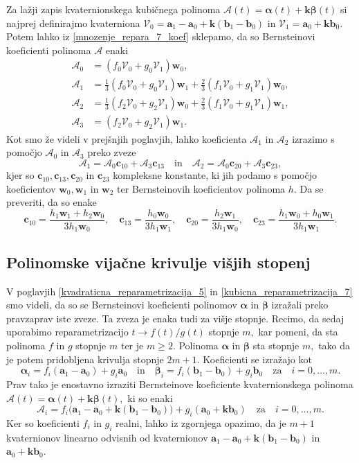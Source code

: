 \documentclass[12pt,a4paper,twoside]{article}
\theoremstyle{definition} %
\theoremstyle{plain} %
\theoremstyle{primerstyle}
\numberwithin{equation}{section}  %
\newcommand{\aV}{\mathbf{a}}
\newcommand{\bV}{\mathbf{b}}
\newcommand{\cV}{\mathbf{c}}
\newcommand{\kV}{\mathbf{k}}
\newcommand{\wV}{\mathbf{w}}
\newcommand{\AQ}{\mathcal{A}}
\newcommand{\VQ}{\mathcal{V}}
\newcommand{\balpha}{\boldsymbol \alpha}
\newcommand{\bbeta}{\boldsymbol \beta}
\begin{document}
Za lažji zapis kvaternionskega kubičnega polinoma $\AQ(t)=\balpha(t)+\kV\bbeta(t)$ si najprej definirajmo kvaterniona $\VQ_0=\aV_1-\aV_0+\kV(\bV_1-\bV_0)$ in $\VQ_1=\aV_0+\kV\bV_0.$ Potem lahko iz \eqref{mnozenje_repara_7_koef} sklepamo, da so Bernsteinovi koeficienti polinoma $\AQ$ enaki
\begin{align*}
	\AQ_0&=(f_0\VQ_0+g_0\VQ_1)\wV_0,\\
	\AQ_1&=\frac{1}{3}(f_0\VQ_0+g_0\VQ_1)\wV_1+\frac{2}{3}(f_1\VQ_0+g_1\VQ_1)\wV_0,\\
	\AQ_2&=\frac{1}{3}(f_2\VQ_0+g_2\VQ_1)\wV_0+\frac{2}{3}(f_1\VQ_0+g_1\VQ_1)\wV_1,\\
	\AQ_3&=(f_2\VQ_0+g_2\VQ_1)\wV_1.
\end{align*}
Kot smo že videli v prejšnjih poglavjih, lahko koeficienta $\AQ_1$ in $\AQ_2$ izrazimo s pomočjo $\AQ_0$ in $\AQ_3$ preko zveze
\begin{equation*}
	\AQ_1=\AQ_0\cV_{10}+\AQ_3\cV_{13}\quad\text{in}\quad\AQ_2=\AQ_0\cV_{20}+\AQ_3\cV_{23},
\end{equation*}
kjer so $\cV_{10},\cV_{13},\cV_{20}$ in $\cV_{23}$ kompleksne konstante, ki jih podamo s pomočjo koeficientov $\wV_0,\wV_1$ in $\wV_2$ ter Bernsteinovih koeficientov polinoma $h.$ Da se preveriti, da so enake
\begin{equation}
	\cV_{10}=\frac{h_1\wV_1+h_2\wV_0}{3h_1\wV_0},\quad\cV_{13}=\frac{h_0\wV_0}{3h_1\wV_1},\quad\cV_{20}=\frac{h_2\wV_1}{3h_1\wV_0},\quad\cV_{23}=\frac{h_1\wV_0+h_0\wV_1}{3h_1\wV_1}.
\end{equation}

\subsection{Polinomske vijačne krivulje višjih stopenj}

V poglavjih \ref{kvadraticna_reparametrizacija_5} in \ref{kubicna_reparametrizacija_7} smo videli, da so se Bernsteinovi koeficienti polinomov $\balpha$ in $\bbeta$ izražali preko pravzaprav iste zveze. Ta zveza je enaka tudi za višje stopnje. Recimo, da sedaj uporabimo reparametrizacijo $t\to f(t)/g(t)$ stopnje $m,$ kar pomeni, da sta polinoma $f$ in $g$ stopnje $m$ ter je $m\geq 2.$ Polinoma $\balpha$ in $\bbeta$ sta stopnje $m,$ tako da je potem pridobljena krivulja stopnje $2m+1.$ Koeficienti se izražajo kot
\begin{equation*}
	\balpha_i=f_i(\aV_1-\aV_0)+g_i\aV_0\quad\text{in}\quad\bbeta_i=f_i(\bV_1-\bV_0)+g_i\bV_0\quad\text{za}\quad i=0,\dots,m.
\end{equation*}
Prav tako je enostavno izraziti Bernsteinove koeficiente kvaternionskega polinoma $\AQ(t)=\balpha(t)+\kV\bbeta(t),$ ki so enaki
\begin{equation*}
	\AQ_i=f_i\big(\aV_1-\aV_0+\kV(\bV_1-\bV_0)\big)+g_i(\aV_0+\kV\bV_0)\quad\text{za}\quad i=0,\dots,m.
\end{equation*}
Ker so koeficienti $f_i$ in $g_i$ realni, lahko iz zgornjega opazimo, da je $m+1$ kvaternionov linearno odvisnih od kvaternionov $\aV_1-\aV_0+\kV(\bV_1-\bV_0)$ in $\aV_0+\kV\bV_0.$
\end{document}
